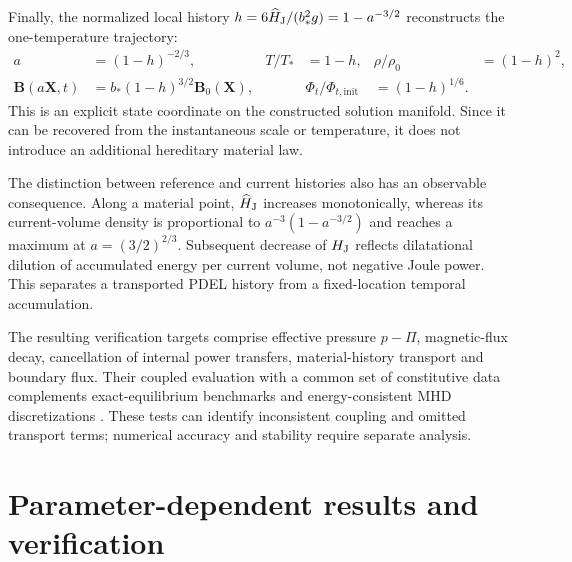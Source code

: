 \documentclass[11pt,a4paper]{article}
\theoremstyle{remark}\newtheorem{remark}{Remark}
\numberwithin{equation}{section}
\newcommand{\BB}{\boldsymbol B}
\newcommand{\XX}{\boldsymbol X}
\begin{document}
Finally, the normalized local history $h=6\widehat H_{\rm J}/(b_*^2g)=1-a^{-3/2}$ reconstructs the one-temperature trajectory:
\begin{equation}
\begin{aligned}
a&=(1-h)^{-2/3},&T/T_*&=1-h,&\rho/\rho_0&=(1-h)^2,\\
\BB(a\XX,t)&=b_*(1-h)^{3/2}\BB_0(\XX),&&
\Phi_t/\Phi_{t,\mathrm{init}}&=(1-h)^{1/6}.
\end{aligned}
\label{eq:historycoordinate}
\end{equation}
This is an explicit state coordinate on the constructed solution manifold. Since it can be recovered from the instantaneous scale or temperature, it does not introduce an additional hereditary material law.

The distinction between reference and current histories also has an observable consequence. Along a material point, $\widehat H_{\rm J}$ increases monotonically, whereas its current-volume density is proportional to $a^{-3}(1-a^{-3/2})$ and reaches a maximum at $a=(3/2)^{2/3}$. Subsequent decrease of $H_{\rm J}$ reflects dilatational dilution of accumulated energy per current volume, not negative Joule power. This separates a transported PDEL history from a fixed-location temporal accumulation.

The resulting verification targets comprise effective pressure $p-\Pi$, magnetic-flux decay, cancellation of internal power transfers, material-history transport and boundary flux. Their coupled evaluation with a common set of constitutive data complements exact-equilibrium benchmarks and energy-consistent MHD discretizations \citep{Landreman,Issan,Gawlik2021,Gawlik2025}. These tests can identify inconsistent coupling and omitted transport terms; numerical accuracy and stability require separate analysis.


\section{Parameter-dependent results and verification}\label{sec:verification}
\end{document}
